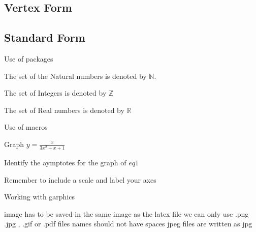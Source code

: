 \documentclass[11pt]{article}
\def\eq1{y=\frac{x}{3x^2+x+1}}
\def\labelaxes{Remember to include a scale and label your axes}
\begin{document}
	\subsection{Vertex Form}
	\subsection{Standard Form}

\vspace{1in}

Use of packages

The set of the Natural numbers is denoted by
$\mathbb{N}$.

The set of Integers is denoted by $\mathbb{Z}$

The set of Real numbers is denoted by $\mathbb{R}$

\vspace{1in}

Use of macros

Graph $\eq1$

Identify the aymptotes for the graph of $eq1$

\labelaxes

\vspace{1in}
Working with garphics

image has to be saved in the same image as the latex file
we can only use .png .jpg , .gif or .pdf files
names should not have spaces
jpeg files are written as jpg
\end{document}
